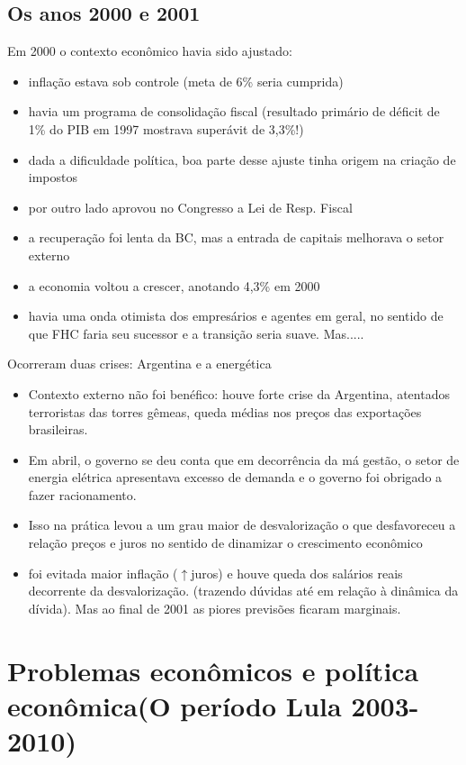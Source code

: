 \documentclass[a4paper,12pt]{article}[abntex2]
\begin{document}
\subsection{\textbf{Os anos 2000 e 2001}}
Em 2000 o contexto econômico havia sido ajustado:\begin{itemize}
    \item inflação estava sob controle (meta de 6\% seria cumprida) 
    \item havia um programa de consolidação fiscal (resultado primário de déficit de 1\% do PIB em 1997 mostrava superávit de 3,3\%!)
    \item dada a dificuldade política, boa parte desse ajuste tinha origem na criação de impostos
    \item por outro lado aprovou no Congresso a Lei de Resp. Fiscal
    \item a recuperação foi lenta da BC, mas a entrada de capitais melhorava o setor externo
    \item a economia voltou a crescer, anotando 4,3\% em 2000
    \item havia uma onda otimista dos empresários e agentes em geral, no sentido de que FHC faria seu sucessor e a transição seria suave. Mas.....
\end{itemize}

Ocorreram duas crises: Argentina e a energética\begin{itemize}
    \item Contexto externo não foi benéfico: houve forte crise da Argentina, atentados terroristas das torres gêmeas, queda médias nos preços das exportações brasileiras. 
    \item Em abril, o governo se deu conta que em decorrência da má gestão, o setor de energia elétrica apresentava excesso de demanda e o governo foi obrigado a fazer racionamento.
    \item Isso na prática levou a um grau maior de desvalorização o que desfavoreceu a relação preços e juros no sentido de dinamizar o crescimento econômico 
    \item foi evitada maior inflação (\(\uparrow\)juros) e houve queda dos salários reais decorrente da desvalorização. (trazendo dúvidas até em relação à dinâmica da dívida). Mas ao final de 2001 as piores previsões ficaram marginais.
\end{itemize}

\newpage
\section{\textbf{Problemas econômicos e política econômica(O período Lula 2003-2010)}}
\end{document}
